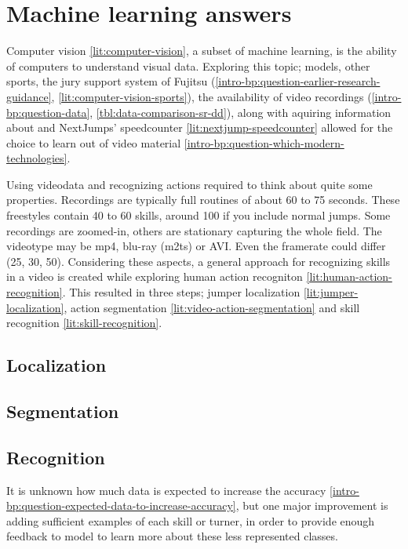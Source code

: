 \section{Machine learning answers}
\label{ch:machine-learning-answers}

Computer vision \ref{lit:computer-vision}, a subset of machine learning, is the ability of computers to understand visual data.
Exploring this topic; models, other sports, the jury support system of Fujitsu (\ref{intro-bp:question-earlier-research-guidance}, \ref{lit:computer-vision-sports}), the availability of video recordings (\ref{intro-bp:question-data}, \ref{tbl:data-comparison-sr-dd}), along with aquiring information about and NextJumps' speedcounter \ref{lit:nextjump-speedcounter} allowed for the choice to learn out of video material \ref{intro-bp:question-which-modern-technologies}.

Using videodata and recognizing actions required to think about quite some properties. Recordings are typically full routines of about 60 to 75 seconds. These freestyles contain 40 to 60 skills, around 100 if you include normal jumps. Some recordings are zoomed-in, others are stationary capturing the whole field. The videotype may be mp4, blu-ray (m2ts) or AVI. Even the framerate could differ (25, 30, 50).
Considering these aspects, a general approach for recognizing skills in a video is created while exploring human action recogniton \ref{lit:human-action-recognition}. This resulted in three steps; jumper localization \ref{lit:jumper-localization}, action segmentation \ref{lit:video-action-segmentation} and skill recognition \ref{lit:skill-recognition}.


\subsection{Localization}

\subsection{Segmentation}

\subsection{Recognition}

It is unknown how much data is expected to increase the accuracy \ref{intro-bp:question-expected-data-to-increase-accuracy}, but one major improvement is adding sufficient examples of each skill or turner, in order to provide enough feedback to model to learn more about these less represented classes.

